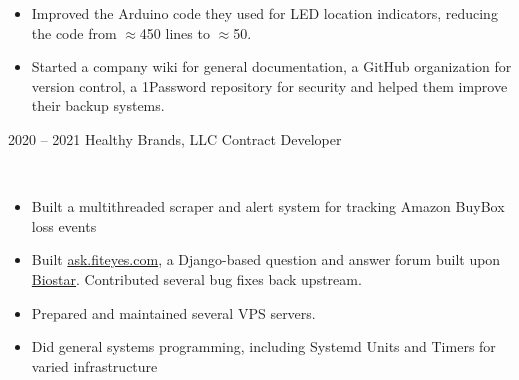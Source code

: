\documentclass[9pt]{developercv} %
\begin{document}
\begin{entrylist}
{\begin{itemize}[leftmargin=*, noitemsep]
            \item Improved the Arduino code they used for LED location indicators, reducing the code from $\approx$450 lines to $\approx$50.
            \item Started a company wiki for general documentation, a GitHub organization for version control, a 1Password repository for
            security and helped them improve their backup systems.
            \end{itemize}
        }
    \entry
        {2020 -- 2021}
        {Healthy Brands, LLC}
        {Contract Developer}
        {
            \slashsep
            \slashsep
            \slashsep
            \slashsep
            \slashsep
            \\
            \begin{itemize}[leftmargin=*, noitemsep]
                \item Built a multithreaded scraper and alert system for tracking Amazon BuyBox loss events
                \item Built {\href{https://ask.fiteyes.com}{ask.fiteyes.com}}, a Django-based question and answer forum built upon {\href{https://github.com/ialbert/biostar-central}{Biostar}}. Contributed several bug fixes back upstream.
                \item Prepared and maintained several VPS servers.
                \item Did general systems programming, including Systemd Units and Timers for varied infrastructure
            \end{itemize}
        }


\end{entrylist}
\end{document}
